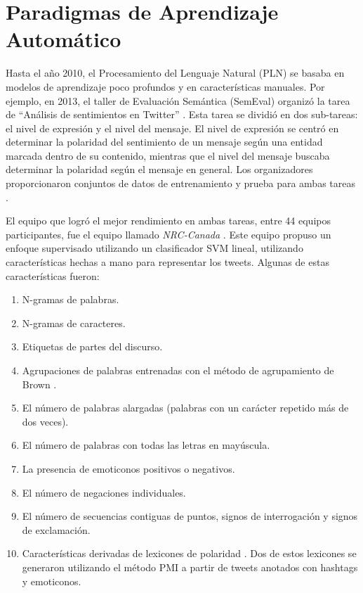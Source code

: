 \section{Paradigmas de Aprendizaje Automático}

Hasta el año 2010, el Procesamiento del Lenguaje Natural (PLN) se basaba en modelos de aprendizaje poco profundos y en características manuales. Por ejemplo, en 2013, el taller de Evaluación Semántica (SemEval) organizó la tarea de ``Análisis de sentimientos en Twitter'' \cite{Semeval2013}. Esta tarea se dividió en dos sub-tareas: el nivel de expresión y el nivel del mensaje. El nivel de expresión se centró en determinar la polaridad del sentimiento de un mensaje según una entidad marcada dentro de su contenido, mientras que el nivel del mensaje buscaba determinar la polaridad según el mensaje en general. Los organizadores proporcionaron conjuntos de datos de entrenamiento y prueba para ambas tareas \cite{Semeval2013}.

El equipo que logró el mejor rendimiento en ambas tareas, entre 44 equipos participantes, fue el equipo llamado \emph{NRC-Canada} \cite{Mohammad2013}. Este equipo propuso un enfoque supervisado utilizando un clasificador SVM lineal, utilizando características hechas a mano para representar los tweets. Algunas de estas características fueron:

\begin{enumerate}
  \item N-gramas de palabras.
  \item N-gramas de caracteres.
  \item Etiquetas de partes del discurso.
  \item Agrupaciones de palabras entrenadas con el método de agrupamiento de Brown \cite{brown1992class}.
  \item El número de palabras alargadas (palabras con un carácter repetido más de dos veces).
  \item El número de palabras con todas las letras en mayúscula.
  \item La presencia de emoticonos positivos o negativos.
  \item El número de negaciones individuales.
  \item El número de secuencias contiguas de puntos, signos de interrogación y signos de exclamación.
  \item Características derivadas de lexicones de polaridad \cite{Mohammad2013}. Dos de estos lexicones se generaron utilizando el método PMI a partir de tweets anotados con hashtags y emoticonos.
\end{enumerate}


